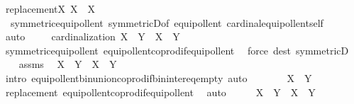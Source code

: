 \begin{isabellebody}
\ replacement{\isacharcolon}{\kern0pt}{\isachardoublequoteopen}{\isasymAnd}X{\isachardot}{\kern0pt}\ X\ {\isasymapprox}\ {\isacharbar}{\kern0pt}X{\isacharbar}{\kern0pt}{\isachardoublequoteclose}\ \ \isanewline
\ \ \ \ \isamarkupfalse%
\ \ symmetric{\isacharunderscore}{\kern0pt}equipollent\ symmetricD{\isacharbrackleft}{\kern0pt}of\ equipollent{\isacharbrackright}{\kern0pt}\ cardinal{\isacharunderscore}{\kern0pt}equipollent{\isacharunderscore}{\kern0pt}self\isanewline
\ \ \ \ \isamarkupfalse%
\ auto\ \isanewline
\ \ \isamarkupfalse%
\ cardinalization{\isacharcolon}{\kern0pt}\ {\isachardoublequoteopen}X\ {\isasymCoprod}\ Y\ {\isasymapprox}\ {\isacharbar}{\kern0pt}X{\isacharbar}{\kern0pt}\ {\isasymCoprod}\ {\isacharbar}{\kern0pt}Y{\isacharbar}{\kern0pt}{\isachardoublequoteclose}\isanewline
\ \ \ \ \isamarkupfalse%
\ symmetric{\isacharunderscore}{\kern0pt}equipollent\ equipollent{\isacharunderscore}{\kern0pt}coprod{\isacharunderscore}{\kern0pt}if{\isacharunderscore}{\kern0pt}equipollent\ \isamarkupfalse%
\ {\isacharparenleft}{\kern0pt}force\ dest{\isacharcolon}{\kern0pt}\ symmetricD{\isacharparenright}{\kern0pt}\isanewline
\ \ \isamarkupfalse%
\ assms\ \isamarkupfalse%
\ {\isachardoublequoteopen}X\ {\isasymunion}\ Y\ {\isasymapprox}\ X\ {\isasymCoprod}\ Y{\isachardoublequoteclose}\ \isamarkupfalse%
\ {\isacharparenleft}{\kern0pt}intro\ equipollent{\isacharunderscore}{\kern0pt}bin{\isacharunderscore}{\kern0pt}union{\isacharunderscore}{\kern0pt}coprod{\isacharunderscore}{\kern0pt}if{\isacharunderscore}{\kern0pt}bin{\isacharunderscore}{\kern0pt}inter{\isacharunderscore}{\kern0pt}eq{\isacharunderscore}{\kern0pt}empty{\isacharparenright}{\kern0pt}\ auto\isanewline
\ \ \isamarkupfalse%
\ \isamarkupfalse%
\ {\isachardoublequoteopen}{\isachardot}{\kern0pt}{\isachardot}{\kern0pt}{\isachardot}{\kern0pt}\ {\isasymapprox}\ {\isacharbar}{\kern0pt}X{\isacharbar}{\kern0pt}\ {\isasymCoprod}\ {\isacharbar}{\kern0pt}Y{\isacharbar}{\kern0pt}{\isachardoublequoteclose}\ \isanewline
\ \ \ \ \isamarkupfalse%
\ replacement\ equipollent{\isacharunderscore}{\kern0pt}coprod{\isacharunderscore}{\kern0pt}if{\isacharunderscore}{\kern0pt}equipollent\ \isamarkupfalse%
\ auto\isanewline
\ \ \isamarkupfalse%
\ \isamarkupfalse%
\ {\isachardoublequoteopen}X\ {\isasymunion}\ Y\ {\isasymapprox}\ {\isacharbar}{\kern0pt}X{\isacharbar}{\kern0pt}\ {\isasymCoprod}\ {\isacharbar}{\kern0pt}Y{\isacharbar}{\kern0pt}{\isachardoublequoteclose}\ \isamarkupfalse%

\end{isabellebody}
